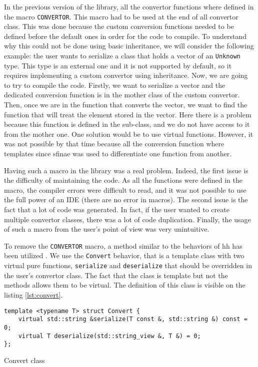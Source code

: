 In the previous version of the library, all the convertor functions where
defined in the macro \texttt{CONVERTOR}. This macro had to be used at the end of
all convertor class. This was done because the custom conversion functions
needed to be defined before the default ones in order for the code to compile.
To understand why this could not be done using basic inheritance, we will
consider the following example: the user wants to serialize a class that holds a
vector of an \texttt{Unknown} type. This type is an external one and it is not
supported by default, so it requires implementing a custom convertor using
inheritance. Now, we are going to try to compile the code. Firstly, we want to
serialize a vector and the dedicated conversion function is in the mother class
of the custom convertor. Then, once we are in the function that converts the
vector, we want to find the function that will treat the element stored in the
vector. Here there is a problem because this function is defined in the
sub-class, and we do not have access to it from the mother one. One solution
would be to use virtual functions. However, it was not possible by that time
because all the conversion function where templates since \gls{sfinae} was used
to differentiate one function from another.

Having such a macro in the library was a real problem. Indeed, the first issue
is the difficulty of maintaining the code. As all the functions were defined in
the macro, the compiler errors were difficult to read, and it was not possible
to use the full power of an IDE (there are no error in macros). The second issue
is the fact that a lot of code was generated. In fact, if the user wanted to
create multiple convertor classes, there was a lot of code duplication. Finally,
the usage of such a macro from the user's point of view was very unintuitive.

To remove the \texttt{CONVERTOR} macro, a method similar to the behaviors of
\gls{hh} has been utilized \cite{bardakoff2021analysis}. We use the
\texttt{Convert} behavior, that is a template class with two virtual pure
functions, \texttt{serialize} and \texttt{deserialize} that should be overridden
in the user's convertor class. The fact that the class is template but not the
methods allows them to be virtual. The definition of this class is visible on
the listing \ref{lst:convert}.

\begin{listing}[ht!]
\begin{verbatim}
template <typename T> struct Convert {
    virtual std::string &serialize(T const &, std::string &) const = 0;
    virtual T deserialize(std::string_view &, T &) = 0;
};
\end{verbatim}
\caption{Convert class}
\label{lst:Convert}
\end{listing}

